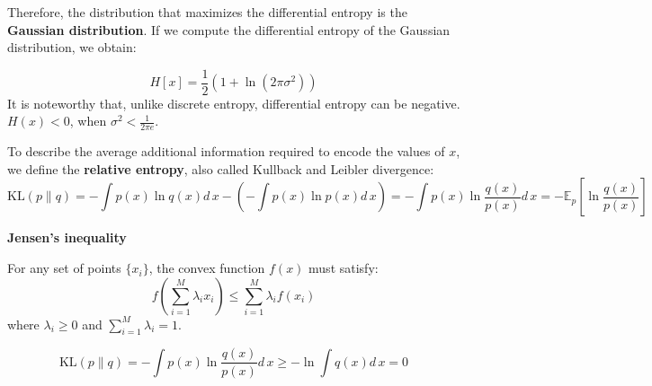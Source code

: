 \documentclass[../main.tex]{subfiles}
\begin{document}
Therefore, the distribution that maximizes the differential entropy is the \textbf{Gaussian distribution}. If we compute the differential entropy of the Gaussian distribution, we obtain:

$$
H[x]=\frac{1}{2}(1+\ln(2\pi\sigma^2))
$$
It is noteworthy that, unlike discrete entropy, differential entropy can be negative.
$H(x)<0$, when $\sigma^2<\frac{1}{2\pi e}$.

\begin{purple}
\begin{definition}
    
To describe the average additional information required to encode the values of $x$, we define the \textbf{relative entropy}, also called  Kullback and Leibler divergence:
$$
\text{KL}(p\parallel q)=-\int p(x)\ln q(x)d\,x-(-\int p(x)\ln p(x)d\,x)=-\int p(x)\ln\frac{q(x)}{p(x)}d\,x=-\mathbb{E}_p[\ln\frac{q(x)}{p(x)}]
$$
    
\end{definition}
\end{purple}


\begin{yellow}
\begin{theorem}
\textbf{Jensen's inequality}

For any set of points $\{x_i\}$, the convex function $f(x)$ must satisfy:
$$
f(\sum_{i=1}^{M}\lambda_ix_i)\leqslant\sum_{i=1}^{M}\lambda_if(x_i)
$$
where $\lambda_i\geqslant0$ and $\sum_{i=1}^{M}\lambda_i=1$.
\end{theorem}
\end{yellow}
$$
\text{KL}(p\parallel q)=-\int p(x)\ln\frac{q(x)}{p(x)}d\,x\geqslant-\ln\int q(x)d\, x=0
$$
\end{document}
